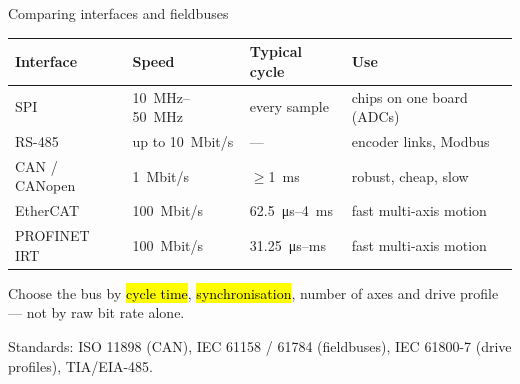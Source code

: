 \documentclass[aspectratio=169,10pt]{beamer}
\begin{document}
\begin{frame}{Comparing interfaces and fieldbuses}
\small
\renewcommand{\arraystretch}{1.2}
\begin{tabularx}{\linewidth}{@{}l l l X@{}}
\toprule
\textbf{Interface} & \textbf{Speed} & \textbf{Typical cycle} & \textbf{Use}\\
\midrule
SPI & \SIrange{10}{50}{MHz} & every sample & chips on one board (ADCs)\\
RS-485 & up to \SI{10}{Mbit/s} & --- & encoder links, Modbus\\
CAN / CANopen & \SI{1}{Mbit/s} & $\ge$\SI{1}{ms} & robust, cheap, slow\\
EtherCAT & \SI{100}{Mbit/s} & \SI{62.5}{\micro s}--\SI{4}{ms} & fast multi-axis motion\\
PROFINET IRT & \SI{100}{Mbit/s} & \SI{31.25}{\micro s}--ms & fast multi-axis motion\\
\bottomrule
\end{tabularx}

\vspace{4mm}
\begin{keybox}
\small Choose the bus by \hl{cycle time}, \hl{synchronisation}, number of axes and drive profile --- not by raw bit rate alone.
\end{keybox}
{\scriptsize\color{mkGray} Standards: ISO 11898 (CAN), IEC 61158 / 61784 (fieldbuses), IEC 61800-7 (drive profiles), TIA/EIA-485.}
\end{frame}
\end{document}
